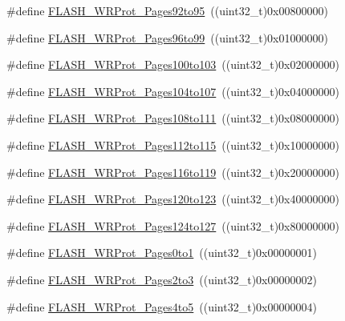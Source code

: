 \begin{DoxyCompactItemize}
\item 
\#define \hyperlink{group___option___bytes___write___protection_gab7d95c1f574523ef827bafd01a64b0bb}{F\+L\+A\+S\+H\+\_\+\+W\+R\+Prot\+\_\+\+Pages92to95}~((uint32\+\_\+t)0x00800000)
\item 
\#define \hyperlink{group___option___bytes___write___protection_ga8f3ea488c33b3e209cab996545f55c49}{F\+L\+A\+S\+H\+\_\+\+W\+R\+Prot\+\_\+\+Pages96to99}~((uint32\+\_\+t)0x01000000)
\item 
\#define \hyperlink{group___option___bytes___write___protection_ga0c03cee6931c623ccdaae19233c81f4e}{F\+L\+A\+S\+H\+\_\+\+W\+R\+Prot\+\_\+\+Pages100to103}~((uint32\+\_\+t)0x02000000)
\item 
\#define \hyperlink{group___option___bytes___write___protection_ga2e096d51e61a972c97093110211b3be5}{F\+L\+A\+S\+H\+\_\+\+W\+R\+Prot\+\_\+\+Pages104to107}~((uint32\+\_\+t)0x04000000)
\item 
\#define \hyperlink{group___option___bytes___write___protection_ga899e34df1ab5369d840461686eb9c318}{F\+L\+A\+S\+H\+\_\+\+W\+R\+Prot\+\_\+\+Pages108to111}~((uint32\+\_\+t)0x08000000)
\item 
\#define \hyperlink{group___option___bytes___write___protection_gacd2d5839240b77f70be15e76086745ab}{F\+L\+A\+S\+H\+\_\+\+W\+R\+Prot\+\_\+\+Pages112to115}~((uint32\+\_\+t)0x10000000)
\item 
\#define \hyperlink{group___option___bytes___write___protection_ga1283655c7c974e0de142cec7921c8673}{F\+L\+A\+S\+H\+\_\+\+W\+R\+Prot\+\_\+\+Pages116to119}~((uint32\+\_\+t)0x20000000)
\item 
\#define \hyperlink{group___option___bytes___write___protection_gac8d2f42123810fefc68572709d8830ec}{F\+L\+A\+S\+H\+\_\+\+W\+R\+Prot\+\_\+\+Pages120to123}~((uint32\+\_\+t)0x40000000)
\item 
\#define \hyperlink{group___option___bytes___write___protection_gae6e70db5200b52248c9ec4293ff9890e}{F\+L\+A\+S\+H\+\_\+\+W\+R\+Prot\+\_\+\+Pages124to127}~((uint32\+\_\+t)0x80000000)
\item 
\#define \hyperlink{group___option___bytes___write___protection_ga7dfbb58b90b63afef11bfcf7a8f109e2}{F\+L\+A\+S\+H\+\_\+\+W\+R\+Prot\+\_\+\+Pages0to1}~((uint32\+\_\+t)0x00000001)
\item 
\#define \hyperlink{group___option___bytes___write___protection_gaeeb592e66053dde68ebb3ff3926d033d}{F\+L\+A\+S\+H\+\_\+\+W\+R\+Prot\+\_\+\+Pages2to3}~((uint32\+\_\+t)0x00000002)
\item 
\#define \hyperlink{group___option___bytes___write___protection_ga2835294ea5c096360cc5683b7f90b543}{F\+L\+A\+S\+H\+\_\+\+W\+R\+Prot\+\_\+\+Pages4to5}~((uint32\+\_\+t)0x00000004)

\end{DoxyCompactItemize}
